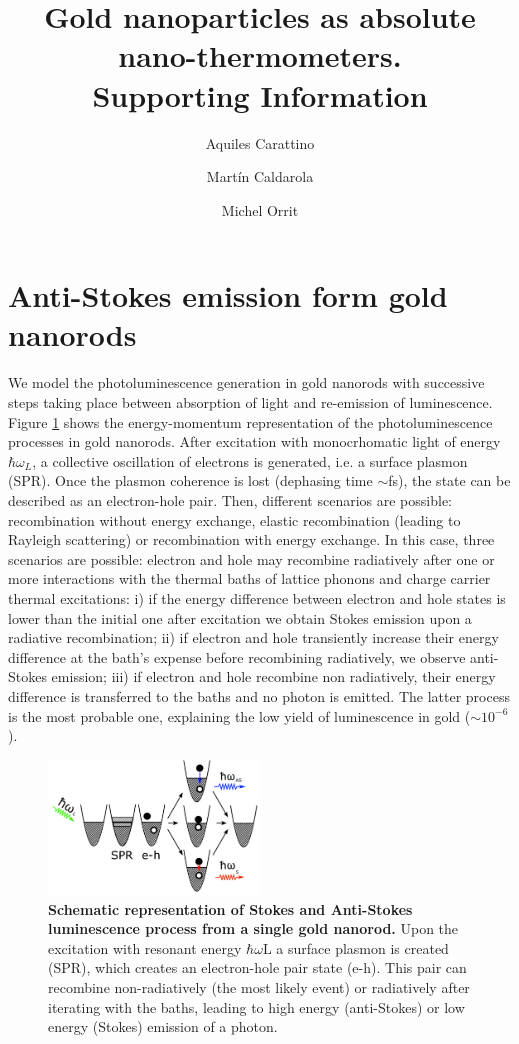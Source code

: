 \documentclass[journal=nalefd,manuscript=letter]{achemso}
\author{Aquiles Carattino}
\affiliation[Leiden]
{Huygens-Kamerlingh Onnes Lab, 2300RA Leiden, The Netherlands}
\author{Mart\'in Caldarola}
\affiliation[Leiden]
{Huygens-Kamerlingh Onnes Lab, 2300RA Leiden, The Netherlands}
\author{Michel Orrit}
\affiliation[Leiden]
{Huygens-Kamerlingh Onnes Lab, 2300RA Leiden, The Netherlands}
\title{Gold nanoparticles as absolute nano-thermometers. \\
Supporting Information}
\begin{document}
\maketitle


\section{Anti-Stokes emission form gold nanorods}\label{sec:AS}

We model the photoluminescence generation in gold nanorods with successive 
steps taking place between absorption of light and re-emission of luminescence\cite{Carattino2016a}. 
Figure \ref{fig:anti-Stokes-process} shows the energy-momentum representation
of the photoluminescence processes in gold nanorods. 
After excitation with monocrhomatic light of energy $\hbar \omega_L$, 
a collective oscillation of electrons is generated, i.e. a surface plasmon (SPR). 
Once the plasmon coherence is lost (dephasing time $\sim$fs), the state can be described as an
electron-hole pair. Then, different scenarios are possible: recombination 
without energy exchange, elastic recombination (leading to Rayleigh scattering) or 
recombination with energy exchange. In this case, three scenarios are possible: electron and hole may
recombine radiatively after one or more interactions with the thermal baths of
lattice phonons and charge carrier thermal excitations: i) if the energy
difference between electron and hole states is lower than the initial one after
excitation we obtain Stokes emission upon a radiative recombination; ii) if
electron and hole transiently increase their energy difference at the bath's
expense before recombining radiatively, we observe anti-Stokes emission; iii) if
electron and hole recombine non radiatively, their energy difference is
transferred to the baths and no photon is emitted. The latter process is the
most probable one, explaining the low yield of luminescence in gold ($\sim 10^{-6}$). 

\begin{figure}[htp] \centering
\includegraphics[width=0.5\textwidth]{Figures/Supplementary/01_AS_Scheme/luminescence_all_AS.png}
\caption{\textbf{Schematic representation of Stokes and Anti-Stokes luminescence process from a single gold nanorod.} 
Upon the excitation with resonant energy $\hbar \omega\textrm{L}$ a surface plasmon is created (SPR), which creates 
an electron-hole pair state (e-h). This pair can recombine non-radiatively (the most likely event) or radiatively
after iterating with the baths, leading to high energy (anti-Stokes) or low energy (Stokes) emission of a photon.}
	\label{fig:anti-Stokes-process}
\end{figure}
\end{document}
